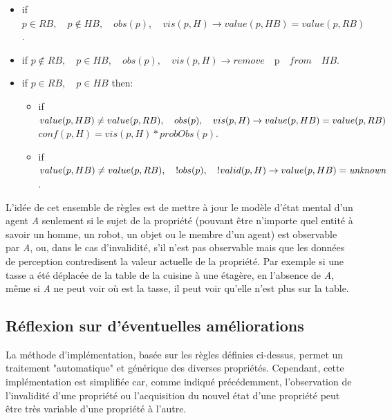 \documentclass[a4paper,11pt,twoside]{StyleThese}
\begin{document}
\begin{itemize}
\item if $p \in RB, \quad p\not\in HB,\quad obs(p),\quad vis(p,H) \rightarrow value(p,HB)=value(p,RB)$.
\item if $p \not \in RB,\quad p\in HB,\quad obs(p),\quad vis(p,H) \rightarrow remove\quad $p$ \quad from \quad HB$.
\item if $p\in RB,\quad p\in HB$ then:
	\begin{itemize}
      \item if $value(p,HB)\neq value(p,RB),\\ \quad obs(p),\quad vis(p,H) \rightarrow  value(p,HB)=value(p,RB)$ \\
      $conf(p,H)=vis(p,H)*probObs(p)$.
      \item if $value(p,HB)\neq value(p,RB),\\ \quad !obs(p),\quad !valid(p,H) \rightarrow  value(p,HB)=\textit{unknown}$.
	\end{itemize}
\end{itemize}

L'idée de cet ensemble de règles est de mettre à jour le modèle d'état mental d'un agent \textit{A} seulement si le sujet de la propriété (pouvant être n'importe quel entité à savoir un homme, un robot, un objet ou le membre d'un agent) est observable par \textit{A}, ou, dans le cas d'invalidité, s'il n'est pas observable mais que les données de perception contredisent la valeur actuelle de la propriété. Par exemple si une tasse a été déplacée de la table de la cuisine à une étagère, en l'absence de \textit{A}, même si \textit{A} ne peut voir où est la tasse, il peut voir qu'elle n'est plus sur la table.


\subsection{Réflexion sur d'éventuelles améliorations}
La méthode d'implémentation, basée sur les règles définies ci-dessus, permet un traitement "automatique" et générique des diverses propriétés.
Cependant, cette implémentation est simplifiée car, comme indiqué précédemment, 
l'observation de l'invalidité d'une propriété ou l'acquisition du nouvel état d'une propriété peut être très variable d'une propriété à l'autre.
\end{document}

